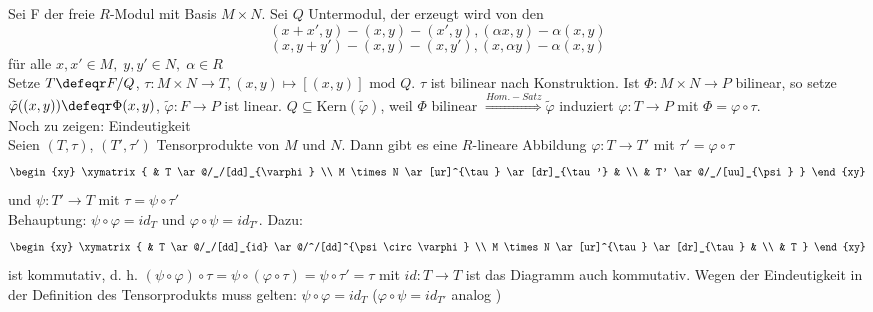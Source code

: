 \begin{anBew}
  Sei F der freie $R$-Modul mit Basis $M \times N$.
  Sei $Q$ Untermodul, der erzeugt wird von den \[(x + x',y) - (x,y) - (x',y),
  (\alpha x,y) - \alpha (x,y)\] \[(x,y + y') - (x,y) - (x,y'),
  (x,\alpha y) - \alpha (x,y)\] für alle $x,x' \in M,\; y,y' \in N,\;\alpha \in
  R$\\
  Setze $T \defeqr F/Q$, $\tau: M \times N \to T, (x,y) \mapsto [(x,y)]
  \mbox{ mod } Q$. $\tau$ ist bilinear nach Konstruktion.
  Ist $\Phi: M \times N \to P$ bilinear, so setze $\tilde{\varphi}((x,y))
  \defeqr \Phi(x,y)$, $\tilde{\varphi}: F \to P$ ist linear. $Q \subseteq
  \mbox{Kern}(\tilde{\varphi})$, weil $\Phi$ bilinear $\overset{Hom.-Satz}{\Rightarrow}
  \tilde{\varphi}$ induziert $\varphi: T \to P$ mit $\Phi = \varphi \circ \tau$.\\
  Noch zu zeigen: Eindeutigkeit\\
  Seien $(T, \tau)$, $(T', \tau')$ Tensorprodukte von $M$ und $N$. Dann gibt es eine $R$-lineare 
  Abbildung $\varphi: T \rightarrow T'$ mit $\tau'= \varphi \circ \tau$
  \[\begin{xy}
      \xymatrix{
                                                  & T \ar@/_/[dd]_{\varphi} \\
        M \times N \ar[ur]^{\tau} \ar[dr]_{\tau'} &                     \\
                                                  & T' \ar@/_/[uu]_{\psi}
      }
    \end{xy}\]
  und $\psi: T' \rightarrow T$ mit $\tau = \psi \circ\tau'$\\
  Behauptung: $\psi \circ \varphi = id_T$ und $\varphi \circ \psi = id_{T'}$. Dazu:
  \[\begin{xy}
      \xymatrix{
                                                 & T \ar@/_/[dd]_{id}
                                                 \ar@/^/[dd]^{\psi \circ \varphi} \\
        M \times N \ar[ur]^{\tau} \ar[dr]_{\tau} &                     \\
                                                 & T
      }
    \end{xy}\]
  ist kommutativ, d. h. 
  $(\psi \circ \varphi ) \circ \tau = \psi \circ ( \varphi \circ \tau) = \psi \circ \tau' = \tau$
  mit $id: T \rightarrow T$ ist das Diagramm auch kommutativ. Wegen der Eindeutigkeit in der 
  Definition des Tensorprodukts muss gelten: $\psi \circ \varphi = id_T$
  ($\varphi \circ \psi = id_{T'}$ analog )
\end{anBew}

